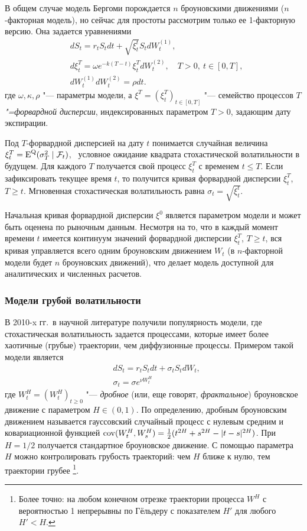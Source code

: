 В общем случае модель Бергоми порождается $n$ броуновскими движениями ($n$-факторная модель), но сейчас для простоты рассмотрим только ее 1-факторную версию.
Она задается уравнениями
\begin{align*}
&d S_t = r_tS_t dt + \sqrt{\xi_t^t} S_t d W_t^{(1)},\\
&d \xi_t^T = \omega e^{-k(T-t)} \xi_t^T d W_t^{(2)}, \quad T>0,\ t\in [0,T],\\
&dW_t^{(1)}dW_t^{(2)} = \rho dt.
\end{align*}
где $\omega,\kappa,\rho$ "--- параметры модели, а $\xi^T = (\xi_t^T)_{t\in[0,T]}$ "--- семейство процессов \emph{$T$"=форвардной дисперсии}, индексированных параметром $T>0$, задающим дату экспирации.

Под $T$-форвардной дисперсией на дату $t$ понимается случайная величина $\xi_t^T = \operatorname{E}^{\mathrm{Q}}(\sigma_T^2 \mid \mathcal{F}_t)$, \te\ условное ожидание квадрата стохастической волатильности в будущем. Для каждого $T$ получается свой процесс $\xi^T_t$ с временем $t\le T$. 
Если зафиксировать текущее время $t$, то получится кривая форвардной дисперсии $\xi_t^T$, $T\ge t$. 
Мгновенная стохастическая волатильность равна $\sigma_t = \sqrt{\xi_t^t}$.

Начальная кривая форвардной дисперсии $\xi^0$ является параметром модели и может быть оценена по рыночным данным.
Несмотря на то, что в каждый момент времени $t$ имеется континуум значений форвардной дисперсии $\xi_t^T$, $T\ge t$, вся кривая управляется всего одним броуновским движением $W_t$ (в $n$-факторной модели будет $n$ броуновских движений), что делает модель доступной для аналитических и численных расчетов.


\subsubsection{Модели грубой волатильности}

В 2010-x гг.\ в научной литературе получили популярность модели, где стохастическая волатильность задается процессами, которые имеет более хаотичные (грубые) траектории, чем диффузионные процессы.
Примером такой модели является
\begin{align*}
&d S_t = r_tS_t dt + \sigma_t S_t d W_t,\\
&\sigma_t = \sigma e^{\nu W_t^H}
\end{align*}
где $W_t^H = (W_t^H)_{t\ge0}$ "--- \emph{дробное} (или, еще говорят, \emph{фрактальное}) броуновское движение с параметром $H\in(0,1)$.
По определению, дробным броуновским движением называется гауссовский случайный процесс с нулевым средним и ковариационной функцией $\operatorname{cov}(W_t^H,W_s^H) = \frac12 (t^{2H} + s^{2H} - |t-s|^{2H}) $.
При $H=1/2$ получается стандартное броуновское движение.
С помощью параметра $H$ можно контролировать грубость траекторий: чем $H$ ближе к нулю, тем траектории грубее%
\footnote{Более точно: на любом конечном отрезке траектории процесса $W^H$ с вероятностью 1 непрерывны по Гёльдеру с показателем $H'$ для любого $H' < H$.}.


